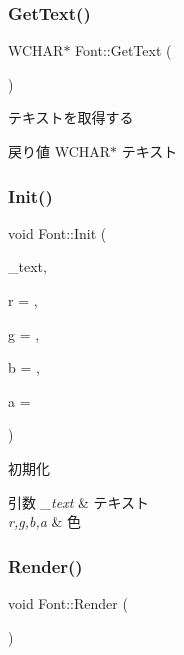 \subsubsection{\texorpdfstring{Get\+Text()}{GetText()}}
{\footnotesize\ttfamily W\+C\+H\+AR$\ast$ Font\+::\+Get\+Text (\begin{DoxyParamCaption}{ }\end{DoxyParamCaption})\hspace{0.3cm}{\ttfamily [inline]}}



テキストを取得する 

\begin{DoxyReturn}{戻り値}
W\+C\+H\+A\+R$\ast$ テキスト 
\end{DoxyReturn}
\mbox{\label{class_font_a35fd445e07010a3ad2c74c93dfa33f66}} 
\subsubsection{\texorpdfstring{Init()}{Init()}}
{\footnotesize\ttfamily void Font\+::\+Init (\begin{DoxyParamCaption}\item[{W\+C\+H\+AR $\ast$}]{\+\_\+text,  }\item[{float}]{r = {},  }\item[{float}]{g = {},  }\item[{float}]{b = {},  }\item[{float}]{a = {} }\end{DoxyParamCaption})}



初期化 


\begin{DoxyParams}{引数}
{\em \+\_\+text} & テキスト \\
\hline
{\em r,g,b,a} & 色 \\
\hline
\end{DoxyParams}
\mbox{\label{class_font_ad0e36f0066cc8724b6cf6833a15aedbc}} 
\subsubsection{\texorpdfstring{Render()}{Render()}}
{\footnotesize\ttfamily void Font\+::\+Render (\begin{DoxyParamCaption}{ }\end{DoxyParamCaption})}



